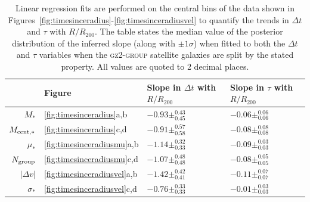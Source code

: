 \documentclass[useAMS,usenatbib]{mn2e}
\begin{document}
\begin{table}

\centering
\caption{Linear regression fits are performed on the central bins of the data shown in Figures~\ref{fig:timesinceradius}-\ref{fig:timesinceradiusvel} to quantify the trends in $\Delta t$ and $\tau$ with $R/R_{200}$. The table states the median value of the posterior distribution of the inferred slope (along with $\pm1\sigma$) when fitted to both the $\Delta t$ and $\tau$ variables when the \textsc{gz2-group} satellite galaxies are split by the stated property. All values are quoted to 2 decimal places.}
\label{table:resultsum}
%
%
%
\setlength\extrarowheight{3pt}
\begin{tabularx}{\textwidth}{r|C|C|C}

\hline
{} & Figure & Slope in $\Delta t$ with $R/R_{200}$        & Slope in $\tau$ with $R/R_{200}$            \\ \hline 
$M_*$                 & \ref{fig:timesinceradius}a,b          & $-0.93\pm_{0.45}^{0.43}$ & $-0.06\pm_{0.06}^{0.06}$ \\
$M_{\rm{cent},*}$     & \ref{fig:timesinceradius}c,d          & $-0.91\pm_{0.58}^{0.57}$ & $-0.08\pm_{0.08}^{0.08}$ \\
$\mu_*$               & \ref{fig:timesinceradiusmu}a,b         & $-1.14\pm_{0.33}^{0.32}$ & $-0.09\pm_{0.03}^{0.03}$ \\
$N_{\rm{group}}$      & \ref{fig:timesinceradiusmu}c,d         & $-1.07\pm_{0.48}^{0.48}$ & $-0.08\pm_{0.05}^{0.05}$ \\
$|\Delta v|$          & \ref{fig:timesinceradiusvel}a,b         & $-1.42\pm_{0.41}^{0.42}$ & $-0.11\pm_{0.07}^{0.07}$ \\
$\sigma_*$            & \ref{fig:timesinceradiusvel}c,d         & $-0.76\pm_{0.33}^{0.33}$ & $-0.01\pm_{0.03}^{0.03}$ \\ \hline
\end{tabularx}
\end{table}
\end{document}
